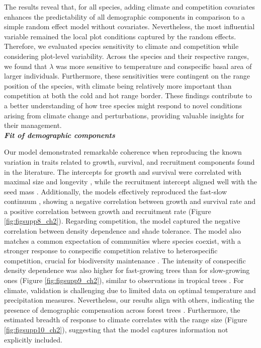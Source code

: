 The results reveal that, for all species, adding climate and competition
covariates enhances the predictability of all demographic components in
comparison to a simple random effect model without covariates.
Nevertheless, the most influential variable remained the local plot
conditions captured by the random effects. Therefore, we evaluated
species sensitivity to climate and competition while considering
plot-level variability. Across the species and their respective ranges,
we found that \(\lambda\) was more sensitive to temperature and
conspecific basal area of larger individuals. Furthermore, these
sensitivities were contingent on the range position of the species, with
climate being relatively more important than competition at both the
cold and hot range border. These findings contribute to a better
understanding of how tree species might respond to novel conditions
arising from climate change and perturbations, providing valuable
insights for their management.\\

\textbf{\emph{Fit of demographic components}}

Our model demonstrated remarkable coherence when reproducing the known
variation in traits related to growth, survival, and recruitment
components found in the literature. The intercepts for growth and
survival were correlated with maximal size and longevity
\citep{burns1990silvics}, while the recruitment intercept aligned well
with the seed mass \citep{diaz2022}. Additionally, the models
effectively reproduced the fast-slow continuum
\citep{SalgueroGomez2016}, showing a negative correlation between growth
and survival rate and a positive correlation between growth and
recruitment rate (Figure \ref{fig:figsupp8_ch2}). Regarding competition, the model captured
the negative correlation between density dependence and shade tolerance.
The model also matches a common expectation of communities where species
coexist, with a stronger response to conspecific competition relative to
heterospecific competition, crucial for biodiversity maintenance
\citep{Chesson2000a}. The intensity of conspecific density dependence
was also higher for fast-growing trees than for slow-growing ones
(Figure \ref{fig:figsupp9_ch2}), similar to observations in tropical trees \citep{Zhu2018}.
For climate, validation is challenging due to limited data on optimal
temperature and precipitation measures. Nevertheless, our results align
with others, indicating the presence of demographic compensation across
forest trees \citep{bohner2020, Yang2022}. Furthermore, the estimated
breadth of response to climate correlates with the range size (Figure
\ref{fig:figsupp10_ch2}), suggesting that the model captures information not explicitly
included.\\


